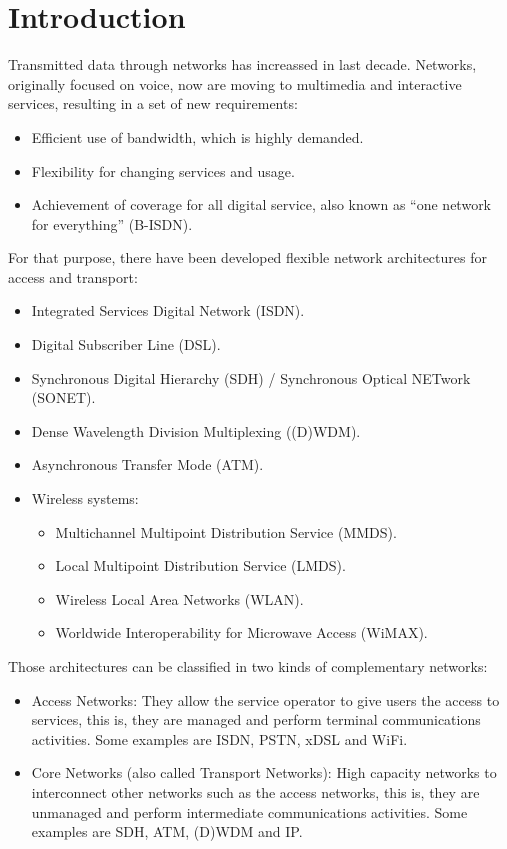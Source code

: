 \documentclass[../main.tex]{subfiles}
\begin{document}
\section{Introduction}

Transmitted data through networks has increassed in last decade. Networks, originally focused on voice, now are moving to multimedia and interactive services, resulting in a set of new requirements:

\begin{itemize}
	\item Efficient use of bandwidth, which is highly demanded.
	\item Flexibility for changing services and usage.
	\item Achievement of coverage for all digital service, also known as ``one network for everything'' (B-ISDN).
\end{itemize}

For that purpose, there have been developed flexible network architectures for access and transport:

\begin{itemize}
	\item Integrated Services Digital Network (ISDN).
	\item Digital Subscriber Line (DSL).
	\item Synchronous Digital Hierarchy (SDH) / Synchronous Optical NETwork (SONET).
	\item Dense Wavelength Division Multiplexing ((D)WDM).
	\item Asynchronous Transfer Mode (ATM).
	\item {
		Wireless systems:
		\begin{itemize}
			\item Multichannel Multipoint Distribution Service (MMDS).
			\item Local Multipoint Distribution Service (LMDS).
			\item Wireless Local Area Networks (WLAN).
			\item Worldwide Interoperability for Microwave Access (WiMAX).
		\end{itemize}
	}
\end{itemize}

Those architectures can be classified in two kinds of complementary networks:

\begin{itemize}
	\item Access Networks: They allow the service operator to give users the access to services, this is, they are managed and perform terminal communications activities. Some examples are ISDN, PSTN, xDSL and WiFi.
	\item Core Networks (also called Transport Networks): High capacity networks to interconnect other networks such as the access networks, this is, they are unmanaged and perform intermediate communications activities. Some examples are SDH, ATM, (D)WDM and IP.
\end{itemize}
\end{document}
